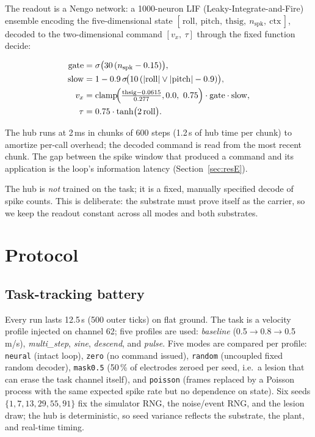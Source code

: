 The readout is a Nengo network: a 1000-neuron LIF (Leaky-Integrate-and-Fire)
ensemble encoding the five-dimensional state
$[\,\mathrm{roll},\ \mathrm{pitch},\ \mathrm{thsig},\ n_{\mathrm{spk}},\ \mathrm{ctx}\,]$,
decoded to the two-dimensional command $[v_x,\ \tau]$ through the fixed
function $\mathrm{decide}$:

\begin{equation}
\begin{aligned}
\mathrm{gate} &= \sigma\bigl(30\,(n_{\mathrm{spk}} - 0.15)\bigr), \\
\mathrm{slow} &= 1 - 0.9\,\sigma\!\bigl(10\,(\lvert\mathrm{roll}\rvert \vee
\lvert\mathrm{pitch}\rvert - 0.9)\bigr), \\
v_x &= \mathrm{clamp}\!\Bigl(\tfrac{\mathrm{thsig} - 0.0615}{0.277},
0.0,\ 0.75\Bigr) \cdot \mathrm{gate}\cdot \mathrm{slow}, \\
\tau &= 0.75 \cdot \tanh\bigl(2\,\mathrm{roll}\bigr).
\end{aligned}
\end{equation}

The hub runs at 2\,ms in chunks of 600 steps (1.2\,s of hub time per chunk) to
amortize per-call overhead; the decoded command is read from the most recent
chunk. The gap between the spike window that produced a command and its
application is the loop's information latency (Section~\ref{sec:resE}).

The hub is \emph{not} trained on the task; it is a fixed, manually specified
decode of spike counts. This is deliberate: the substrate must prove itself as
the carrier, so we keep the readout constant across all modes and both
substrates.

\section{Protocol}

\subsection{Task-tracking battery}

Every run lasts 12.5\,s (500 outer ticks) on flat ground. The task is a velocity
profile injected on channel 62; five profiles are used: \emph{baseline}
(0.5$\rightarrow$0.8$\rightarrow$0.5\,m/s), \emph{multi\_step}, \emph{sine},
\emph{descend}, and \emph{pulse}. Five modes are compared per profile:
\texttt{neural} (intact loop), \texttt{zero} (no command issued), \texttt{random}
(uncoupled fixed random decoder), \texttt{mask0.5} (50\,\% of electrodes zeroed
per seed, i.e.\ a lesion that can erase the task channel itself), and
\texttt{poisson} (frames replaced by a Poisson process with the same expected
spike rate but no dependence on state). Six seeds
$\{1,7,13,29,55,91\}$ fix the simulator RNG, the noise/event RNG, and the
lesion draw; the hub is deterministic, so seed variance reflects the substrate,
the plant, and real-time timing.

